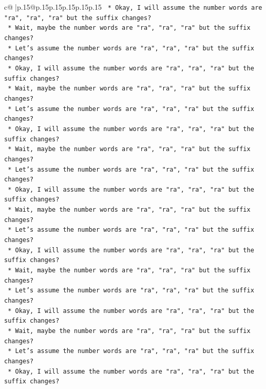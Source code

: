 \documentclass{article}
\begin{document}
{\begin{supertabular}{c@{$\;$}|p{.15\linewidth}@{}p{.15\linewidth}p{.15\linewidth}p{.15\linewidth}p{.15\linewidth}p{.15\linewidth}}
{{{\texttt{    *   Okay, I will assume the number words are "ra", "ra", "ra" but the suffix changes?} \\
\texttt{    *   Wait, maybe the number words are "ra", "ra", "ra" but the suffix changes?} \\
\texttt{    *   Let's assume the number words are "ra", "ra", "ra" but the suffix changes?} \\
\texttt{    *   Okay, I will assume the number words are "ra", "ra", "ra" but the suffix changes?} \\
\texttt{    *   Wait, maybe the number words are "ra", "ra", "ra" but the suffix changes?} \\
\texttt{    *   Let's assume the number words are "ra", "ra", "ra" but the suffix changes?} \\
\texttt{    *   Okay, I will assume the number words are "ra", "ra", "ra" but the suffix changes?} \\
\texttt{    *   Wait, maybe the number words are "ra", "ra", "ra" but the suffix changes?} \\
\texttt{    *   Let's assume the number words are "ra", "ra", "ra" but the suffix changes?} \\
\texttt{    *   Okay, I will assume the number words are "ra", "ra", "ra" but the suffix changes?} \\
\texttt{    *   Wait, maybe the number words are "ra", "ra", "ra" but the suffix changes?} \\
\texttt{    *   Let's assume the number words are "ra", "ra", "ra" but the suffix changes?} \\
\texttt{    *   Okay, I will assume the number words are "ra", "ra", "ra" but the suffix changes?} \\
\texttt{    *   Wait, maybe the number words are "ra", "ra", "ra" but the suffix changes?} \\
\texttt{    *   Let's assume the number words are "ra", "ra", "ra" but the suffix changes?} \\
\texttt{    *   Okay, I will assume the number words are "ra", "ra", "ra" but the suffix changes?} \\
\texttt{    *   Wait, maybe the number words are "ra", "ra", "ra" but the suffix changes?} \\
\texttt{    *   Let's assume the number words are "ra", "ra", "ra" but the suffix changes?} \\
\texttt{    *   Okay, I will assume the number words are "ra", "ra", "ra" but the suffix changes?} \\
}}}
\end{supertabular}}
\end{document}
